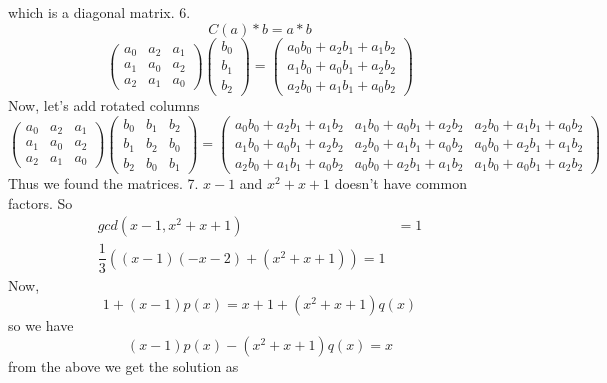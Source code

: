 \documentclass{article}
\begin{document}
which is a diagonal matrix.
6.
\begin{equation}
	C(a)*b = a*b
\end{equation}
\begin{equation}
	\begin{pmatrix}
		a_0 & a_2 & a_1 \\
		a_1 & a_0 & a_2 \\
		a_2 & a_1 & a_0
	\end{pmatrix}
	\begin{pmatrix}
		b_0 \\
		b_1 \\
		b_2
	\end{pmatrix}=
\begin{pmatrix}
	a_0b_0+a_2b_1+a_1b_2 \\
	a_1b_0+a_0b_1+a_2b_2 \\
	a_2b_0+a_1b_1+a_0b_2
\end{pmatrix}
\end{equation}
Now, let's add rotated columns
\begin{equation}
	\begin{pmatrix}
		a_0 & a_2 & a_1 \\
		a_1 & a_0 & a_2 \\
		a_2 & a_1 & a_0
	\end{pmatrix}
	\begin{pmatrix}
		b_0  & b_1 & b_2\\
		b_1 & b_2 & b_0\\
		b_2 & b_0 & b_1
	\end{pmatrix}=
	\begin{pmatrix}
		a_0b_0+a_2b_1+a_1b_2 & a_1b_0+a_0b_1+a_2b_2 & a_2b_0+a_1b_1+a_0b_2\\
		a_1b_0+a_0b_1+a_2b_2 & a_2b_0+a_1b_1+a_0b_2 & a_0b_0+a_2b_1+a_1b_2\\
		a_2b_0+a_1b_1+a_0b_2 & a_0b_0+a_2b_1+a_1b_2 & a_1b_0+a_0b_1+a_2b_2
	\end{pmatrix}
\end{equation}
Thus we found the matrices.
7.
$x-1$ and $x^2+x+1$ doesn't have common factors. So
\begin{align}
	gcd(x-1, x^2+x+1) &=  1 \\
	\dfrac{1}{3}((x-1)(-x-2)+(x^2+x+1)) = 1
\end{align}
Now,
\begin{equation}
	1+(x-1)p(x)=x+1+(x^2+x+1)q(x)
\end{equation}
so we have
\begin{equation}
	(x-1)p(x)-(x^2+x+1)q(x) = x
\end{equation}
from the above we get the solution as
\end{document}
